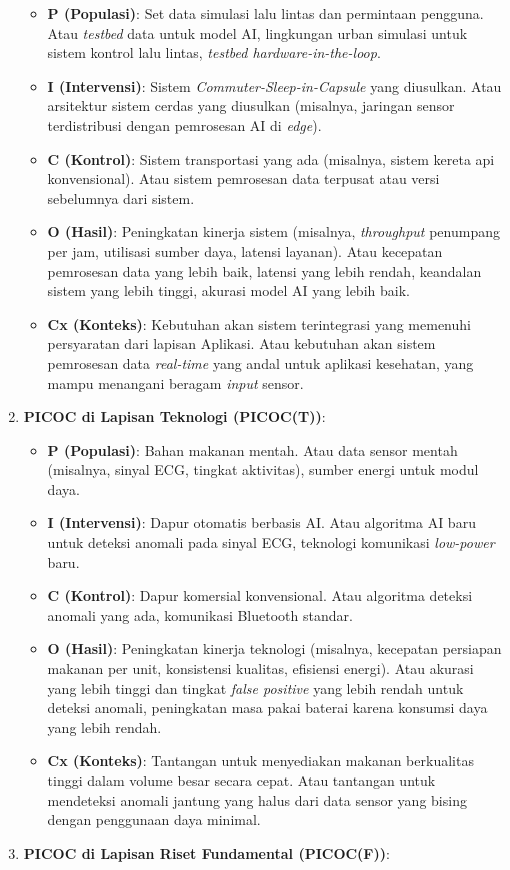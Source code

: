 \documentclass[
  letterpaper,
  DIV=11,
  numbers=noendperiod]{scrreprt}
\providecommand{\tightlist}{%
  \setlength{\itemsep}{0pt}\setlength{\parskip}{0pt}}
\begin{document}
\begin{enumerate}
  \begin{itemize}
  \tightlist
  \item
    \textbf{P (Populasi)}: Set data simulasi lalu lintas dan permintaan
    pengguna. Atau \emph{testbed} data untuk model AI, lingkungan urban
    simulasi untuk sistem kontrol lalu lintas, \emph{testbed
    hardware-in-the-loop}.
  \item
    \textbf{I (Intervensi)}: Sistem \emph{Commuter-Sleep-in-Capsule}
    yang diusulkan. Atau arsitektur sistem cerdas yang diusulkan
    (misalnya, jaringan sensor terdistribusi dengan pemrosesan AI di
    \emph{edge}).
  \item
    \textbf{C (Kontrol)}: Sistem transportasi yang ada (misalnya, sistem
    kereta api konvensional). Atau sistem pemrosesan data terpusat atau
    versi sebelumnya dari sistem.
  \item
    \textbf{O (Hasil)}: Peningkatan kinerja sistem (misalnya,
    \emph{throughput} penumpang per jam, utilisasi sumber daya, latensi
    layanan). Atau kecepatan pemrosesan data yang lebih baik, latensi
    yang lebih rendah, keandalan sistem yang lebih tinggi, akurasi model
    AI yang lebih baik.
  \item
    \textbf{Cx (Konteks)}: Kebutuhan akan sistem terintegrasi yang
    memenuhi persyaratan dari lapisan Aplikasi. Atau kebutuhan akan
    sistem pemrosesan data \emph{real-time} yang andal untuk aplikasi
    kesehatan, yang mampu menangani beragam \emph{input} sensor.
  \end{itemize}
\item
  \textbf{PICOC di Lapisan Teknologi (PICOC(T))}:

  \begin{itemize}
  \tightlist
  \item
    \textbf{P (Populasi)}: Bahan makanan mentah. Atau data sensor mentah
    (misalnya, sinyal ECG, tingkat aktivitas), sumber energi untuk modul
    daya.
  \item
    \textbf{I (Intervensi)}: Dapur otomatis berbasis AI. Atau algoritma
    AI baru untuk deteksi anomali pada sinyal ECG, teknologi komunikasi
    \emph{low-power} baru.
  \item
    \textbf{C (Kontrol)}: Dapur komersial konvensional. Atau algoritma
    deteksi anomali yang ada, komunikasi Bluetooth standar.
  \item
    \textbf{O (Hasil)}: Peningkatan kinerja teknologi (misalnya,
    kecepatan persiapan makanan per unit, konsistensi kualitas,
    efisiensi energi). Atau akurasi yang lebih tinggi dan tingkat
    \emph{false positive} yang lebih rendah untuk deteksi anomali,
    peningkatan masa pakai baterai karena konsumsi daya yang lebih
    rendah.
  \item
    \textbf{Cx (Konteks)}: Tantangan untuk menyediakan makanan
    berkualitas tinggi dalam volume besar secara cepat. Atau tantangan
    untuk mendeteksi anomali jantung yang halus dari data sensor yang
    bising dengan penggunaan daya minimal.
  \end{itemize}
\item
  \textbf{PICOC di Lapisan Riset Fundamental (PICOC(F))}:


\end{enumerate}
\end{document}
